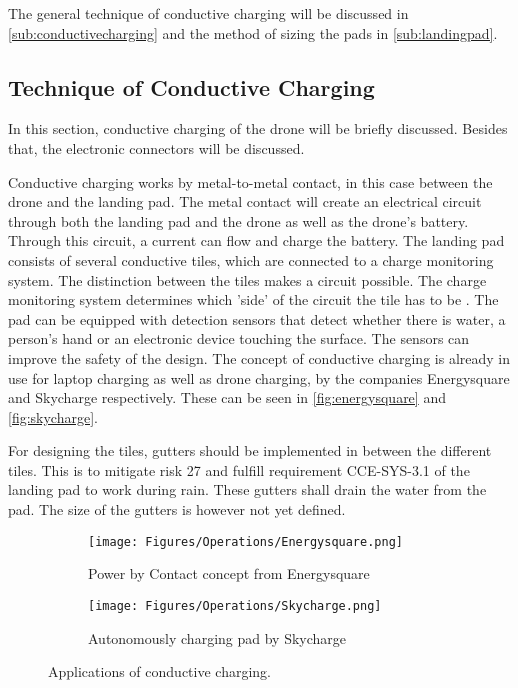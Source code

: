 The general technique of conductive charging will be discussed in \autoref{sub:conductivecharging} and the method of sizing the pads  in \autoref{sub:landingpad}.

\subsection{Technique of Conductive Charging}\label{sub:conductivecharging}
In this section, conductive charging of the drone will be briefly discussed. Besides that, the electronic connectors will be discussed.

Conductive charging works by metal-to-metal contact, in this case between the drone and the landing pad. The metal contact will create an electrical circuit through both the landing pad and the drone as well as the drone's battery. Through this circuit, a current can flow and charge the battery. The landing pad consists of several conductive tiles, which are connected to a charge monitoring system. The distinction between the tiles makes a circuit possible. The charge monitoring system determines which 'side' of the circuit the tile has to be \cite{energysquare}. The pad can be equipped with detection sensors that detect whether there is water, a person's hand or an electronic device touching the surface. The sensors can improve the safety of the design. The concept of conductive charging is already in use for laptop charging as well as drone charging, by the companies Energysquare and Skycharge respectively. These can be seen in \autoref{fig:energysquare} and \autoref{fig:skycharge}.

For designing the tiles, gutters should be implemented in between the different tiles. This is to mitigate risk 27 and fulfill requirement CCE-SYS-3.1  of the landing pad to work during rain. These gutters shall drain the water from the pad. The size of the gutters is however not yet defined.


\begin{figure}[h]
    \begin{subfigure}{0.48\textwidth}
        \centering
        \texttt{[image: Figures/Operations/Energysquare.png]}
        \caption{Power by Contact concept from Energysquare \cite{energysquare}}
        \label{fig:energysquare}
    \end{subfigure}
    \begin{subfigure}{0.48\textwidth}
        \centering
        \texttt{[image: Figures/Operations/Skycharge.png]}
        \caption{Autonomously charging pad by Skycharge \cite{skycharge}}
        \label{fig:skycharge}
    \end{subfigure}
    \caption{Applications of conductive charging.}
    \label{fig:conductivecharging}
\end{figure}


